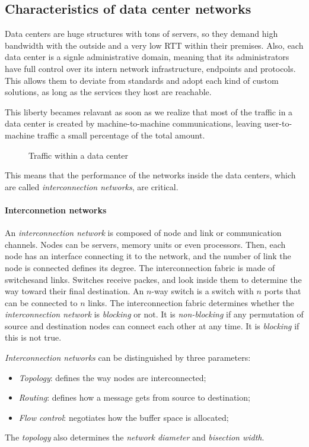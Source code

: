 \subsection{Characteristics of data center networks}
Data centers are huge structures with tons of servers, so they demand high
bandwidth with the outside and a very low RTT within their premises. Also,
each data center is a signle administrative domain, meaning that its
administrators have full control over its intern network infrastructure, 
endpoints and protocols. This allows them to deviate from standards and adopt
each kind of custom solutions, as long as the services they host are reachable.

This liberty becames relavant as soon as we realize that most of the traffic
in a data center is created by machine-to-machine communications, leaving
user-to-machine traffic a small percentage of the total amount. 

\begin{figure}[h!]
    \centering
    \caption{Traffic within a data center}
\end{figure}

\noindent
This means that the performance of the networks inside the data centers, which
are called \emph{interconnection networks}, are critical.

\paragraph{Interconnetion networks}
An \emph{interconnection network} is composed of node and link or communication
channels. Nodes can be servers, memory units or even processors. Then, each node
has an interface connecting it to the network, and the number of link the node
is connected defines its degree. The interconnection fabric is made of
switches\footnotemark and links. Switches receive packes, and look inside them
to determine the way toward their final destination. An $n$-way switch is a
switch with $n$ ports that can be connected to $n$ links. The interconnection
fabric determines whether the \emph{interconnection network} is \emph{blocking}
or not. It is \emph{non-blocking} if any permutation of source and destination
nodes can connect each other at any time. It is \emph{blocking} if this is not
true.


\bigskip\noindent
\emph{Interconnection networks} can be distinguished by three parameters:
\begin{itemize}
    \item \emph{Topology}: defines the way nodes are interconnected;
    \item \emph{Routing}: defines how a message gets from source to destination;
    \item \emph{Flow control}: negotiates how the buffer space is allocated;
\end{itemize}
The \emph{topology} also determines the \emph{network diameter} and
\emph{bisection width}.

